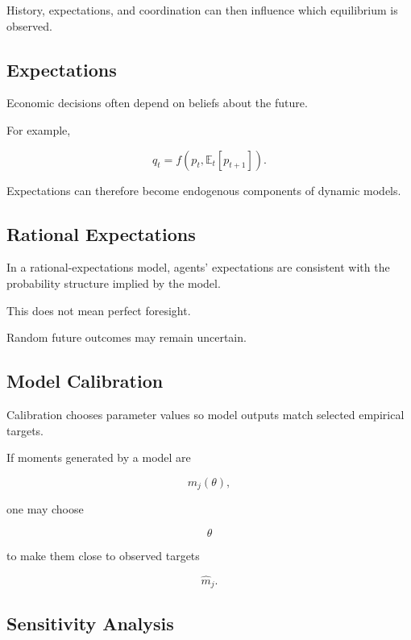 History, expectations, and coordination can then influence which equilibrium
is observed.

\subsection{Expectations}
\label{subsec:economic-expectations}

Economic decisions often depend on beliefs about the future.

For example,

\[
\boxed{
q_t
=
f
\left(
p_t,
\mathbb{E}_t[p_{t+1}]
\right).
}
\]

Expectations can therefore become endogenous components of dynamic models.

\subsection{Rational Expectations}
\label{subsec:rational-expectations}

In a rational-expectations model, agents' expectations are consistent with
the probability structure implied by the model.

This does not mean perfect foresight.

Random future outcomes may remain uncertain.

\subsection{Model Calibration}
\label{subsec:economic-calibration}

Calibration chooses parameter values so model outputs match selected
empirical targets.

If moments generated by a model are

\[
m_j(\theta),
\]

one may choose

\[
\boxed{
\theta
}
\]

to make them close to observed targets

\[
\hat m_j.
\]

\subsection{Sensitivity Analysis}
\label{subsec:economic-sensitivity-analysis}


